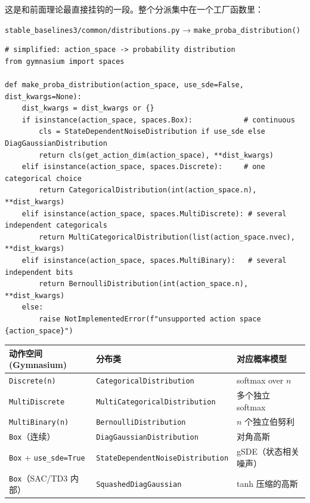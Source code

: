 \documentclass[11pt,a4paper]{article}
\begin{document}
这是和前面理论最直接挂钩的一段。整个分派集中在一个工厂函数里：

\begin{srcbox}
\texttt{stable\_baselines3/common/distributions.py} → \texttt{make\_proba\_distribution()}
\end{srcbox}

\begin{lstlisting}
# simplified: action_space -> probability distribution
from gymnasium import spaces

def make_proba_distribution(action_space, use_sde=False, dist_kwargs=None):
    dist_kwargs = dist_kwargs or {}
    if isinstance(action_space, spaces.Box):            # continuous
        cls = StateDependentNoiseDistribution if use_sde else DiagGaussianDistribution
        return cls(get_action_dim(action_space), **dist_kwargs)
    elif isinstance(action_space, spaces.Discrete):     # one categorical choice
        return CategoricalDistribution(int(action_space.n), **dist_kwargs)
    elif isinstance(action_space, spaces.MultiDiscrete): # several independent categoricals
        return MultiCategoricalDistribution(list(action_space.nvec), **dist_kwargs)
    elif isinstance(action_space, spaces.MultiBinary):   # several independent bits
        return BernoulliDistribution(int(action_space.n), **dist_kwargs)
    else:
        raise NotImplementedError(f"unsupported action space {action_space}")
\end{lstlisting}

\begin{center}
\begin{tabular}{l l l}
\toprule
\textbf{动作空间(Gymnasium)} & \textbf{分布类} & \textbf{对应概率模型} \\
\midrule
\texttt{Discrete(n)} & \texttt{CategoricalDistribution} & softmax over $n$ \\
\texttt{MultiDiscrete} & \texttt{MultiCategoricalDistribution} & 多个独立 softmax \\
\texttt{MultiBinary(n)} & \texttt{BernoulliDistribution} & $n$ 个独立伯努利 \\
\texttt{Box}（连续） & \texttt{DiagGaussianDistribution} & 对角高斯 \\
\texttt{Box} + \texttt{use\_sde=True} & \texttt{StateDependentNoiseDistribution} & gSDE（状态相关噪声） \\
\texttt{Box}（SAC/TD3 内部） & \texttt{SquashedDiagGaussian} & tanh 压缩的高斯 \\
\bottomrule
\end{tabular}
\end{center}
\end{document}
